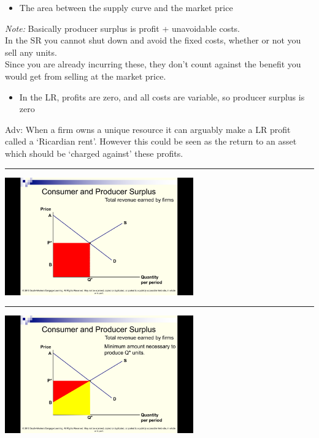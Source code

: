 \documentclass[]{article}
\providecommand{\tightlist}{%
  \setlength{\itemsep}{0pt}\setlength{\parskip}{0pt}}
\begin{document}
\begin{itemize}
\tightlist
\item
  The area between the supply curve and the market price
\end{itemize}

\emph{Note:}
Basically producer surplus is profit + unavoidable costs.\\
In the SR you cannot shut down and avoid the fixed costs, whether or not you sell any units.\\
Since you are already incurring these, they don't count against the benefit you would get from selling at the market price.

\begin{itemize}
\tightlist
\item
  In the LR, profits are zero, and all costs are variable, so producer surplus is zero
\end{itemize}

Adv: When a firm owns a unique resource it can arguably make a LR profit called a `Ricardian rent'.
However this could be seen as the return to an asset which should be `charged against' these profits.

\begin{center}\rule{0.5\linewidth}{\linethickness}\end{center}

\includegraphics[height=2in]{picsfigs/prodsurp1.png}

\begin{center}\rule{0.5\linewidth}{\linethickness}\end{center}

\includegraphics[height=2in]{picsfigs/prodsurp2.png}
\end{document}
